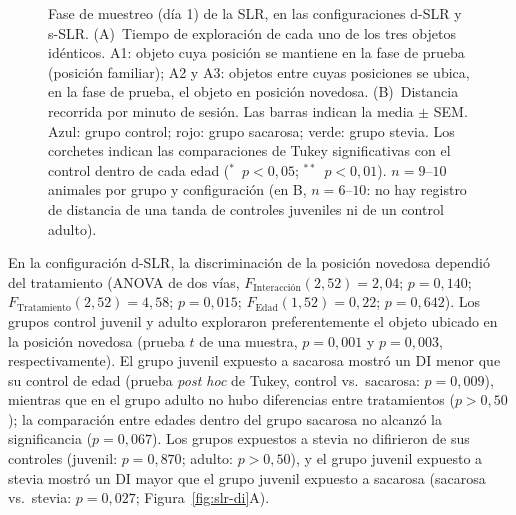\begin{figure}[htbp]
  \centering
  \caption[Exploración de los objetos y distancia recorrida en la fase de muestreo de la SLR]{Fase de muestreo (día 1) de la SLR, en las configuraciones d-SLR y s-SLR. (A)~Tiempo de exploración de cada uno de los tres objetos idénticos. A1: objeto cuya posición se mantiene en la fase de prueba (posición familiar); A2 y A3: objetos entre cuyas posiciones se ubica, en la fase de prueba, el objeto en posición novedosa. (B)~Distancia recorrida por minuto de sesión. Las barras indican la media $\pm$ SEM. Azul: grupo control; rojo: grupo sacarosa; verde: grupo stevia. Los corchetes indican las comparaciones de Tukey significativas con el control dentro de cada edad ($^{*}$~$p < 0{,}05$; $^{**}$~$p < 0{,}01$). $n = 9$--$10$ animales por grupo y configuración (en B, $n = 6$--$10$: no hay registro de distancia de una tanda de controles juveniles ni de un control adulto).}
  \label{fig:slr-dia1}
\end{figure}


En la configuración d-SLR, la discriminación de la posición novedosa dependió del tratamiento (ANOVA de dos vías, $F_{\text{Interacción}}(2, 52) = 2{,}04$; $p = 0{,}140$; $F_{\text{Tratamiento}}(2, 52) = 4{,}58$; $p = 0{,}015$; $F_{\text{Edad}}(1, 52) = 0{,}22$; $p = 0{,}642$). Los grupos control juvenil y adulto exploraron preferentemente el objeto ubicado en la posición novedosa (prueba $t$ de una muestra, $p = 0{,}001$ y $p = 0{,}003$, respectivamente). El grupo juvenil expuesto a sacarosa mostró un DI menor que su control de edad (prueba \textit{post hoc} de Tukey, control vs.\ sacarosa: $p = 0{,}009$), mientras que en el grupo adulto no hubo diferencias entre tratamientos ($p > 0{,}50$); la comparación entre edades dentro del grupo sacarosa no alcanzó la significancia ($p = 0{,}067$). Los grupos expuestos a stevia no difirieron de sus controles (juvenil: $p = 0{,}870$; adulto: $p > 0{,}50$), y el grupo juvenil expuesto a stevia mostró un DI mayor que el grupo juvenil expuesto a sacarosa (sacarosa vs.\ stevia: $p = 0{,}027$; Figura~\ref{fig:slr-di}A).

